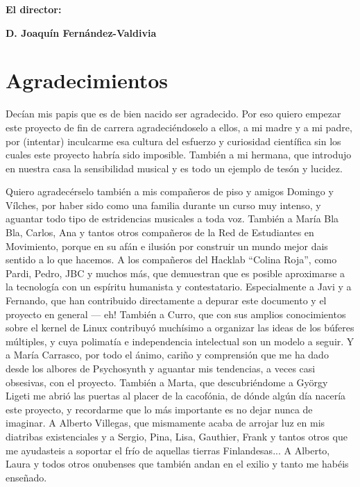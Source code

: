 \textbf{El director:}
\vspace{4cm}

\noindent 
\textbf{D. Joaquín Fernández-Valdivia}%



\thispagestyle{empty}

\chapter*{Agradecimientos}

Decían mis papis que es de bien nacido ser agradecido. Por eso quiero
empezar este proyecto de fin de carrera agradeciéndoselo a ellos, a mi
madre y a mi padre, por (intentar) inculcarme esa cultura del esfuerzo
y curiosidad científica sin los cuales este proyecto habría sido
imposible. También a mi hermana, que introdujo en nuestra casa la
sensibilidad musical y es todo un ejemplo de tesón y lucidez.

Quiero agradecérselo también a mis compañeros de piso y amigos Domingo
y Vílches, por haber sido como una familia durante un curso muy
intenso, y aguantar todo tipo de estridencias musicales a toda
voz. También a María Bla Bla, Carlos, Ana y tantos otros compañeros de
la Red de Estudiantes en Movimiento, porque en su afán e ilusión por
construir un mundo mejor dais sentido a lo que hacemos. A los
compañeros del Hacklab ``Colina Roja'', como Pardi, Pedro, JBC y
muchos más, que demuestran que es posible aproximarse a la tecnología
con un espíritu humanista y contestatario. Especialmente a Javi y a
Fernando, que han contribuido directamente a depurar este documento y
el proyecto en general --- eh! También a Curro, que con sus amplios
conocimientos sobre el kernel de Linux contribuyó muchísimo a
organizar las ideas de los búferes múltiples, y cuya polimatía e
independencia intelectual son un modelo a seguir. Y a María Carrasco,
por todo el ánimo, cariño y comprensión que me ha dado desde los
albores de Psychosynth y aguantar mis tendencias, a veces casi
obsesivas, con el proyecto. También a Marta, que descubriéndome a
György Ligeti me abrió las puertas al placer de la cacofónia, de dónde
algún día nacería este proyecto, y recordarme que lo más importante es
no dejar nunca de imaginar. A Alberto Villegas, que mismamente acaba
de arrojar luz en mis diatribas existenciales y a Sergio, Pina,
Lisa, Gauthier, Frank y tantos otros que me ayudasteis a soportar el
frío de aquellas tierras Finlandesas... A Alberto, Laura y todos
otros onubenses que también andan en el exilio y tanto me habéis
enseñado.

